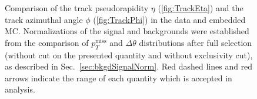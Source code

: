 


\begin{figure}[ht!]
\centering
\parbox{0.4725\textwidth}{
  \centering
  \begin{subfigure}[b]{\linewidth}{
                }
  \end{subfigure}
}%
\quad\quad%
\parbox{0.4725\textwidth}{%
  \centering
  \begin{subfigure}[b]{\linewidth}{
                }
  \end{subfigure}
}%
\caption[Comparison of distribution of track $\eta$ and $\phi$ in the data and embedded MC]
{Comparison of the track pseudorapidity $\eta$ (\ref{fig:TrackEta}) and the track azimuthal angle $\phi$ (\ref{fig:TrackPhi}) in the data and embedded MC. Normalizations of the signal and backgrounds were established from the comparison of $p_{T}^{\textrm{miss}}$ and $\Delta\theta$ distributions after full selection (without cut on the presented quantity and without exclusivity cut), as described in Sec.~\ref{sec:bkgdSignalNorm}. Red dashed lines and red arrows indicate the range of each quantity which is accepted in analysis.}\label{fig:TrackEtaPhi}
\end{figure}
